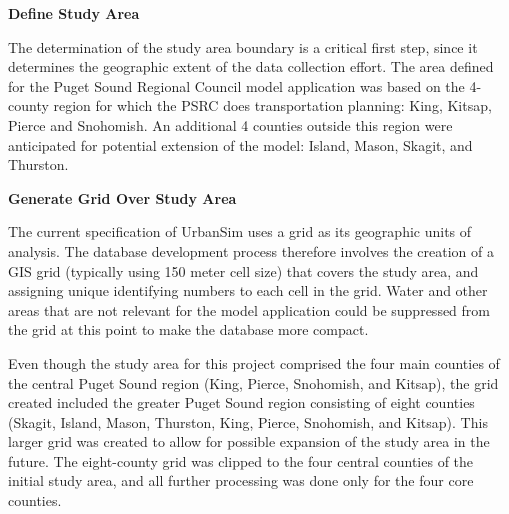 \begin{description}
\item{\textbf{Define Study Area}}

The determination of the study area boundary is a critical first
step, since it determines the geographic extent of the data
collection effort. The area defined for the Puget Sound Regional
Council model application was based on the 4-county region for
which the PSRC does transportation planning: King, Kitsap, Pierce
and Snohomish. An additional 4 counties outside this region were
anticipated for potential extension of the model: Island, Mason,
Skagit, and Thurston.  %


\item{\textbf{Generate Grid Over Study Area}}

The current specification of UrbanSim uses a grid as its
geographic units of analysis.  The database development process
therefore involves the creation of a GIS grid (typically using 150
meter cell size) that covers the study area, and assigning unique
identifying numbers to each cell in the grid. Water and other
areas that are not relevant for the model application could be
suppressed from the grid at this point to make the database more
compact.

Even though the study area for this project comprised the four
main counties of the central Puget Sound region (King, Pierce,
Snohomish, and Kitsap), the grid created included the greater
Puget Sound region consisting of eight counties (Skagit, Island,
Mason, Thurston, King, Pierce, Snohomish, and Kitsap).  This
larger grid was created to allow for possible expansion of the
study area in the future.  The eight-county grid was clipped to
the four central counties of the initial study area, and all
further processing was done only for the four core counties.



\end{description}
